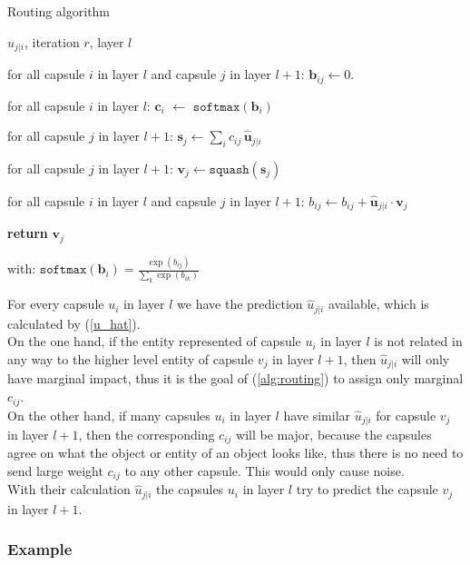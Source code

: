 \documentclass{article}
\begin{document}
{\begin{algorithm}[!htb]
   \caption{Routing algorithm \cite{hinton17}}
   \label{alg:routing}
\begin{algorithmic}
    $\hat{u}_{j|i}$, iteration $r$, layer $l$
   \item for all capsule $i$ in layer $l$ and capsule $j$ in layer $l+1$: $\textbf{b}_{ij} \leftarrow 0$.
   \item for all capsule $i$ in layer $l$: $\textbf{c}_i$ $\leftarrow$ $\texttt{softmax}(\textbf{b}_i)$
   \item for all capsule $j$ in layer $l+1$: $\textbf{s}_j \leftarrow \sum_i c_{ij} \, \hat{\textbf{u}}_{j|i}$
   \item for all capsule $j$ in layer $l+1$: $\textbf{v}_j \leftarrow  \texttt{squash}(\textbf{s}_j)$
   \item for all capsule $i$ in layer $l$ and capsule $j$ in layer $l+1$: $b_{ij} \leftarrow b_{ij} + \hat{\textbf{u}}_{j|i} \cdot \textbf{v}_j$
   \ENDFOR
   \item \textbf{return} $\textbf{v}_j$
   \newline
   \item with: $\texttt{softmax}(\textbf{b}_i) = \frac{\exp(b_{ij})}{\sum_k \exp (b_{ik})}$
\end{algorithmic}
\end{algorithm}

For every capsule $u_i$ in layer $l$ we have the prediction $\hat{u}_{j|i}$ available, which is calculated by (\ref{u_hat}).\\
On the one hand, if the entity represented of capsule $u_i$ in layer $l$ is not related in any way to the higher level entity of capsule $v_j$ in layer $l+1$, then $\hat{u}_{j|i}$ will only have marginal impact, thus it is the goal of (\ref{alg:routing}) to assign only marginal $c_{ij}$.\\
On the other hand, if many capsules $u_i$ in layer $l$ have similar $\hat{u}_{j|i}$ for capsule $v_j$ in layer $l+1$, then the corresponding $c_{ij}$ will be major, because the capsules agree on what the object or entity of an object looks like, thus there is no need to send large weight $c_{ij}$ to any other capsule. This would only cause noise.\\
With their calculation $\hat{u}_{j|i}$ the capsules $u_i$ in layer $l$ try to predict the capsule $v_j$ in layer $l+1$.

\subsubsection{Example}
\label{example}

}
\end{document}

